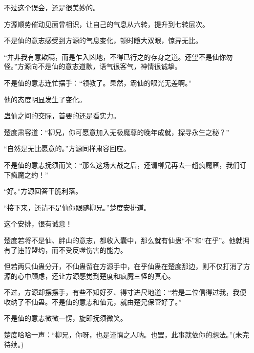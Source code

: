 \begin{this_body}
不过这个误会，还是很美妙的。

方源顺势催动见面曾相识，让自己的气息从六转，提升到七转层次。

不是仙的意志感受到方源的气息变化，顿时瞪大双眼，惊异无比。

“并非我有意欺瞒，而是乍入凶地，不得已行之的存身之道。还望不是仙你勿怪。”方源向不是仙的意志道歉，语气很客气，神情很诚挚。

不是仙的意志连忙摆手：“领教了。果然，霸仙的眼光无差啊。”

他的态度明显发生了变化。

蛊仙之间的交际，首要的还是看实力。

楚度肃容道：“柳兄，你可愿意加入无极魔尊的晚年成就，探寻永生之秘？”

“自然是无比愿意的。”方源同样肃容回应。

不是仙的意志抚须而笑：“那么这场大战之后，还请柳兄再去一趟疯魔窟，我们订下疯魔之约！”

“好。”方源回答干脆利落。

“接下来，还请不是仙你跟随柳兄。”楚度安排道。

这个安排，很有诚意！

楚度若将不是仙、胖山的意志，都收入囊中，那么就有仙蛊“不”和“在乎”。他就拥有了违背盟约，而不受反噬伤害的能力。

但若两只仙蛊分开，不仙蛊留在方源手中，在乎仙蛊在楚度那边，则不仅打消了方源的心中顾虑，还让方源感觉到楚度和疯魔三怪的真心。

不过，方源却摆摆手，有些不知好歹、得寸进尺地道：“若是二位信得过我，我便收纳了不仙蛊。不是仙的意志和仙元，就由楚兄保管好了。”

不是仙的意志微微一愣，旋即抚须微笑。

楚度哈哈一声：“柳兄，你呀，也是谨慎之人呐。也罢，此事就依你的想法。”(未完待续。)

\end{this_body}


